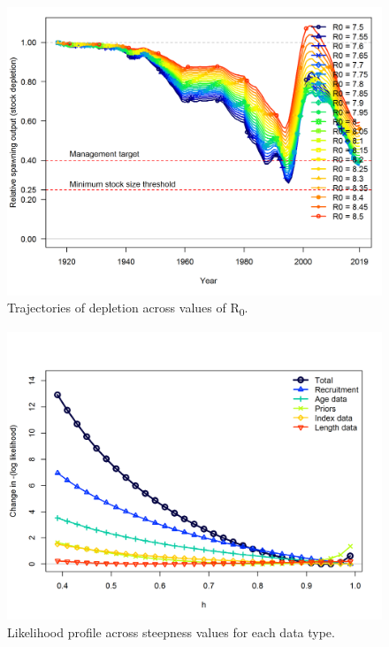 \documentclass[12pt,]{article}
\begin{document}
\begin{figure}
\centering
\includegraphics{Figures/profile_R0_depl.png}
\caption{Trajectories of depletion across values of R\textsubscript{0}.
\label{fig:profile_R0_depl}}
\end{figure}

\FloatBarrier

\begin{figure}
\centering
\includegraphics{Figures/profile_h_like.png}
\caption{Likelihood profile across steepness values for each data type.
\label{fig:profile_h_like}}
\end{figure}

\FloatBarrier 
\end{document}
